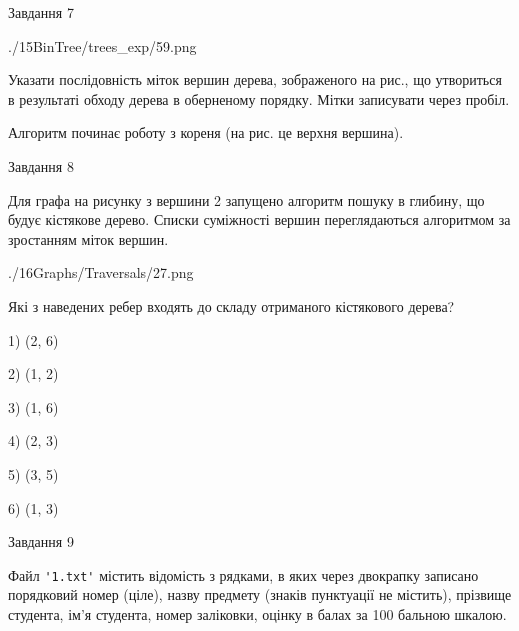 \documentclass[12pt, ukrainian]{article}
\def\code#1{\Verb!#1!}
\begin{document}
{\vspace{10mm}\par

\newpage
\begin{minipage}[t]{9.7cm}
               
{\begin{center}Завдання {7}\end{center}}
\vspace{-6mm}

\begin{center}
	{./15BinTree/trees_exp/59.png}
\end{center}
Указати послідовність міток вершин дерева, зображеного на рис., що утвориться в результаті обходу дерева в оберненому порядку. Мітки записувати через пробіл.\par Алгоритм починає роботу з кореня (на рис. це верхня вершина).\par

\end{minipage}
\vline \hspace{8mm}
\begin{minipage}[t]{8.0cm}
               
{\begin{center}Завдання {8}\end{center}}
\vspace{-6mm}
Для графа на рисунку з вершини 2 запущено алгоритм пошуку в глибину, що будує кістякове дерево. Списки суміжності вершин переглядаються алгоритмом за зростанням міток вершин.\par
\begin{center}
	{./16Graphs/Traversals/27.png}
\end{center}
\par Які з наведених ребер входять до складу отриманого кістякового дерева?\par
1) (2, 6)\par
2) (1, 2)\par
3) (1, 6)\par
4) (2, 3)\par
5) (3, 5)\par
6) (1, 3)\par
{\vskip 15pt} \par

\end{minipage}

               
{\begin{center}Завдання {9}\end{center}}
\vspace{-6mm}
Файл \code{'1.txt'} містить відомість з рядками, в яких через двокрапку записано поряд\-ковий номер (ціле), назву предмету (знаків пунктуації не містить), прізвище студента, ім'я студента, номер заліковки, оцінку в балах за 100 бальною шкалою.

}
\end{document}
